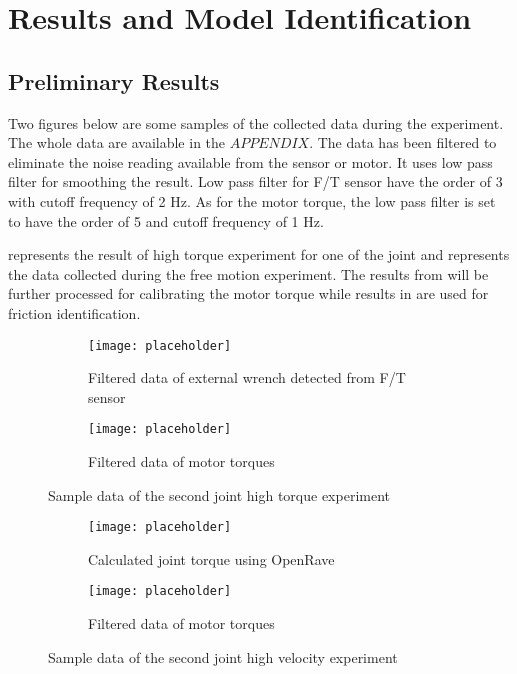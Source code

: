 \chapter{Results and Model Identification}
\section{Preliminary Results}
Two figures below are some samples of the collected data during the experiment. The whole data are available in the $APPENDIX$. The data has been filtered to eliminate the noise reading available from the sensor or motor. It uses low pass filter for smoothing the result. Low pass filter for F/T sensor have the order of 3 with cutoff frequency of 2 Hz. As for the motor torque, the low pass filter is set to have the order of 5 and cutoff frequency of 1 Hz.

 represents the result of high torque experiment for one of the joint and  represents the data collected during the free motion experiment. The results from  will be further processed for calibrating the motor torque while results in  are used for friction identification.

\begin{figure}[h]
  \begin{subfigure}[t]{0.5\textwidth}
    \centering
    \texttt{[image: placeholder]} 
    \caption{Filtered data of external wrench detected from F/T sensor}
  \end{subfigure}
  \begin{subfigure}[t]{0.5\textwidth}
    \centering
    \texttt{[image: placeholder]}
    \caption{Filtered data of motor torques}
  \end{subfigure}
  \caption{Sample data of the second joint high torque experiment}
  \label{fig: push result}
\end{figure}

\begin{figure}[h]
  \begin{subfigure}[t]{0.5\textwidth}
    \centering
    \texttt{[image: placeholder]} 
    \caption{Calculated joint torque using OpenRave}
  \end{subfigure}
  \begin{subfigure}[t]{0.5\textwidth}
    \centering
    \texttt{[image: placeholder]}
    \caption{Filtered data of motor torques}
  \end{subfigure}
  \caption{Sample data of the second joint high velocity experiment}
  \label{fig: fric result}
\end{figure}


